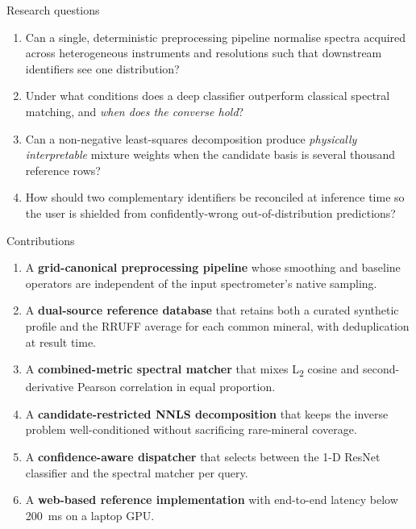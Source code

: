 \documentclass[10pt,aspectratio=169,xcolor=dvipsnames]{beamer}
\begin{document}
\begin{frame}{Research questions}
  \begin{enumerate}\setlength\itemsep{0.5em}
    \item Can a single, deterministic preprocessing pipeline normalise
          spectra acquired across heterogeneous instruments and resolutions
          such that downstream identifiers see one distribution?
    \item Under what conditions does a deep classifier outperform classical
          spectral matching, and \emph{when does the converse hold}?
    \item Can a non-negative least-squares decomposition produce
          \emph{physically interpretable} mixture weights when the candidate
          basis is several thousand reference rows?
    \item How should two complementary identifiers be reconciled at
          inference time so the user is shielded from confidently-wrong
          out-of-distribution predictions?
  \end{enumerate}
\end{frame}

\begin{frame}{Contributions}
  \begin{enumerate}\setlength\itemsep{0.4em}
    \item A \textbf{grid-canonical preprocessing pipeline} whose smoothing
          and baseline operators are independent of the input spectrometer's
          native sampling.
    \item A \textbf{dual-source reference database} that retains both a
          curated synthetic profile and the RRUFF average for each common
          mineral, with deduplication at result time.
    \item A \textbf{combined-metric spectral matcher} that mixes L\textsubscript{2}
          cosine and second-derivative Pearson correlation in equal proportion.
    \item A \textbf{candidate-restricted NNLS decomposition} that keeps the
          inverse problem well-conditioned without sacrificing rare-mineral
          coverage.
    \item A \textbf{confidence-aware dispatcher} that selects between the
          1-D ResNet classifier and the spectral matcher per query.
    \item A \textbf{web-based reference implementation} with end-to-end
          latency below \SI{200}{\milli\second} on a laptop GPU.
  \end{enumerate}
\end{frame}
\end{document}
